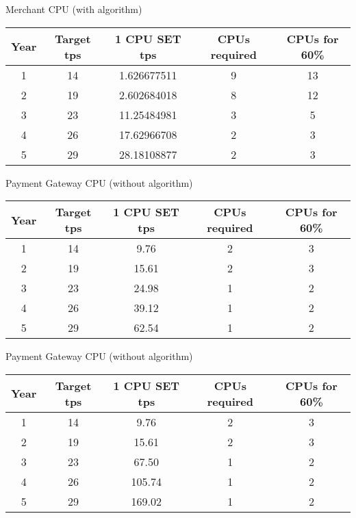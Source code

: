 \begin{center}
  Merchant CPU (with algorithm)
  \begin{tabular}{ |c|c|c|c|c| }
    \hline
    Year & Target tps & 1 CPU SET tps & CPUs required & CPUs for 60\% \\
    \hline
    1    & 14         & 1.626677511   & 9             & 13            \\
    \hline
    2    & 19         & 2.602684018   & 8             & 12            \\
    \hline
    3    & 23         & 11.25484981   & 3             & 5             \\
    \hline
    4    & 26         & 17.62966708   & 2             & 3             \\
    \hline
    5    & 29         & 28.18108877   & 2             & 3             \\
    \hline
  \end{tabular}
\end{center}

\begin{center}
  Payment Gateway CPU (without algorithm)
  \begin{tabular}{ |c|c|c|c|c| }
    \hline
    Year & Target tps & 1 CPU SET tps & CPUs required & CPUs for 60\% \\
    \hline
    1    & 14         & 9.76          & 2             & 3             \\
    \hline
    2    & 19         & 15.61         & 2             & 3             \\
    \hline
    3    & 23         & 24.98         & 1             & 2             \\
    \hline
    4    & 26         & 39.12         & 1             & 2             \\
    \hline
    5    & 29         & 62.54         & 1             & 2             \\
    \hline
  \end{tabular}
\end{center}

\begin{center}
  Payment Gateway CPU (without algorithm)
  \begin{tabular}{ |c|c|c|c|c| }
    \hline
    Year & Target tps & 1 CPU SET tps & CPUs required & CPUs for 60\% \\
    \hline
    1    & 14         & 9.76          & 2             & 3             \\
    \hline
    2    & 19         & 15.61         & 2             & 3             \\
    \hline
    3    & 23         & 67.50         & 1             & 2             \\
    \hline
    4    & 26         & 105.74        & 1             & 2             \\
    \hline
    5    & 29         & 169.02        & 1             & 2             \\
    \hline
  \end{tabular}
\end{center}


